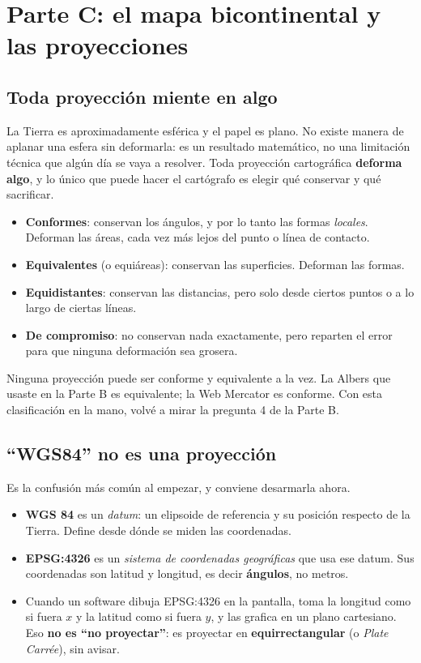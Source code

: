 \documentclass{article}
\begin{document}
\section{Parte C: el mapa bicontinental y las proyecciones}

\subsection{Toda proyección miente en algo}

La Tierra es aproximadamente esférica y el papel es plano. No existe manera de aplanar una esfera sin deformarla: es un resultado matemático, no una limitación técnica que algún día se vaya a resolver. Toda proyección cartográfica \textbf{deforma algo}, y lo único que puede hacer el cartógrafo es elegir qué conservar y qué sacrificar.

\begin{itemize}
    \item \textbf{Conformes}: conservan los ángulos, y por lo tanto las formas \emph{locales}. Deforman las áreas, cada vez más lejos del punto o línea de contacto.
    \item \textbf{Equivalentes} (o equiáreas): conservan las superficies. Deforman las formas.
    \item \textbf{Equidistantes}: conservan las distancias, pero solo desde ciertos puntos o a lo largo de ciertas líneas.
    \item \textbf{De compromiso}: no conservan nada exactamente, pero reparten el error para que ninguna deformación sea grosera.
\end{itemize}

Ninguna proyección puede ser conforme y equivalente a la vez. La Albers que usaste en la Parte B es equivalente; la Web Mercator es conforme. Con esta clasificación en la mano, volvé a mirar la pregunta 4 de la Parte B.

\subsection{``WGS84'' no es una proyección}

Es la confusión más común al empezar, y conviene desarmarla ahora.

\begin{itemize}
    \item \textbf{WGS 84} es un \emph{datum}: un elipsoide de referencia y su posición respecto de la Tierra. Define desde dónde se miden las coordenadas.
    \item \textbf{EPSG:4326} es un \emph{sistema de coordenadas geográficas} que usa ese datum. Sus coordenadas son latitud y longitud, es decir \textbf{ángulos}, no metros.
    \item Cuando un software dibuja EPSG:4326 en la pantalla, toma la longitud como si fuera $x$ y la latitud como si fuera $y$, y las grafica en un plano cartesiano. Eso \textbf{no es ``no proyectar''}: es proyectar en \textbf{equirrectangular} (o \textit{Plate Carrée}), sin avisar.
\end{itemize}
\end{document}
